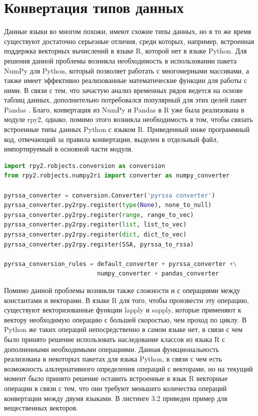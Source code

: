 \documentclass[specialist,
			   substylefile = spbu_report.rtx,
			   subf,href,colorlinks=true, 12pt]{disser}
\begin{document}
\section{Конвертация типов данных}

Данные языки во многом похожи, имеют схожие типы данных, но в то же время существуют достаточно серьезные отличия, среди которых, например, встроенная поддержка векторных вычислений в языке R, которой нет в языке Python. Для решения данной проблемы возникла необходимость в использовании пакета NumPy \cite{numpy-doc} для Python, который позволяет работать с многомерными массивами, а также имеет эффективно реализованные математические функции для работы с ними. В связи с тем, что зачастую анализ временных рядов ведется на основе таблиц данных, дополнительно потребовался популярный для этих целей пакет Pandas \cite{pandas-doc}.  Благо, конвертация из NumPy и Pandas в R уже была реализована в модуле rpy2, однако, помимо этого возникла необходимость в том, чтобы связать встроенные типы данных Python с языком R. Приведенный ниже программный код, отвечающий за правила конвертации, выделен в отдельный файл, импортируемый в основной части модуля.\\

\noindent
\begin{minipage}{\linewidth}
\begin{lstlisting}[language=Python, caption=Конвертация из Python в R.]
import rpy2.robjects.conversion as conversion
from rpy2.robjects.numpy2ri import converter as numpy_converter

pyrssa_converter = conversion.Converter('pyrssa converter')
pyrssa_converter.py2rpy.register(type(None), none_to_null)
pyrssa_converter.py2rpy.register(range, range_to_vec)
pyrssa_converter.py2rpy.register(list, list_to_vec)
pyrssa_converter.py2rpy.register(dict, dict_to_vec)
pyrssa_converter.py2rpy.register(SSA, pyrssa_to_rssa)

pyrssa_conversion_rules = default_converter + pyrssa_converter +\
                          numpy_converter + pandas_converter
\end{lstlisting}
\end{minipage}

Помимо данной проблемы возникли также сложности и с операциями между константами и векторами. В языке R для того, чтобы произвести эту операцию, существуют векторизованные функции lapply и sapply, которые применяют к вектору необходимую операцию с большей скоростью, чем проход по циклу. В Python же таких операций непосредственно в самом языке нет, в связи с чем было принято решение использовать наследование классов из языка R с дополненными необходимыми операциями. Данная функциональность реализована в некоторых пакетах \cite{habr-doc} для языка Python, в связи с чем есть возможность альтернативного определения операций с векторами, но на текущий момент было принято решение оставить встроенные в язык R векторные операции в связи с тем, что они требуют меньшего количества операций конвертации между двумя языками. В листинге 3.2 приведен пример для вещественных векторов.
\end{document}

